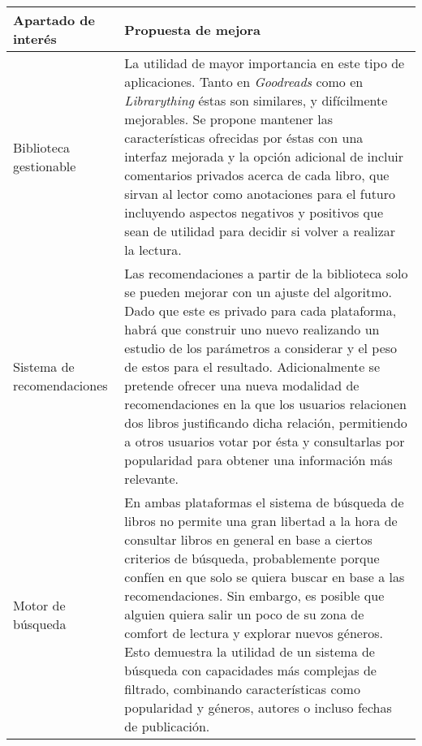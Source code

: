 \begin{table}[H]
    \begin{tabularx}{\linewidth}{|X|X|}
        \hline
        \textbf{Apartado de interés} & \textbf{Propuesta de mejora} \\
        \hline
        Biblioteca gestionable     & La utilidad de mayor importancia en este tipo de aplicaciones. Tanto en \textit{Goodreads} como en \textit{Librarything} éstas son similares, y difícilmente mejorables. Se propone mantener las características ofrecidas por éstas con una interfaz mejorada y la opción adicional de incluir comentarios privados acerca de cada libro, que sirvan al lector como anotaciones para el futuro incluyendo aspectos negativos y positivos que sean de utilidad para decidir si volver a realizar la lectura. \\ 
        \hline
        Sistema de recomendaciones & Las recomendaciones a partir de la biblioteca solo se pueden mejorar con un ajuste del algoritmo. Dado que este es privado para cada plataforma, habrá que construir uno nuevo realizando un estudio de los parámetros a considerar y el peso de estos para el resultado. Adicionalmente se pretende ofrecer una nueva modalidad de recomendaciones en la que los usuarios relacionen dos libros justificando dicha relación, permitiendo a otros usuarios votar por ésta y consultarlas por popularidad para obtener una información más relevante. \\ 
        \hline
        Motor de búsqueda   & En ambas plataformas el sistema de búsqueda de libros no permite una gran libertad a la hora de consultar libros en general en base a ciertos criterios de búsqueda, probablemente porque confíen en que solo se quiera buscar en base a las recomendaciones. Sin embargo, es posible que alguien quiera salir un poco de su zona de comfort de lectura y explorar nuevos géneros. Esto demuestra la utilidad de un sistema de búsqueda con capacidades más complejas de filtrado, combinando características como popularidad y géneros, autores o incluso fechas de publicación. \\ 
        \hline
    \end{tabularx}
\end{table}
